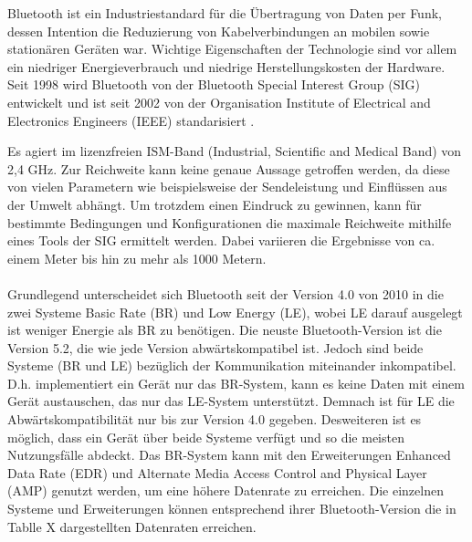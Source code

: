 Bluetooth ist ein Industriestandard für die Übertragung von Daten per Funk, dessen Intention die Reduzierung von Kabelverbindungen an mobilen sowie stationären Geräten war. Wichtige Eigenschaften der Technologie sind vor allem ein niedriger Energieverbrauch und niedrige Herstellungskosten der Hardware. Seit 1998 wird Bluetooth von der Bluetooth Special Interest Group (SIG) entwickelt und ist seit 2002 von der Organisation Institute of Electrical and Electronics Engineers (IEEE) standarisiert \cite{IEEE}.

Es agiert im lizenzfreien ISM-Band (Industrial, Scientific and Medical Band) von 2,4 GHz. 
Zur Reichweite kann keine genaue Aussage getroffen werden, da diese von vielen Parametern wie beispielsweise der Sendeleistung und Einflüssen aus der Umwelt abhängt. Um trotzdem einen Eindruck zu gewinnen, kann für bestimmte Bedingungen und Konfigurationen die maximale Reichweite mithilfe eines Tools \cite{BtRangeTool} der SIG ermittelt werden. Dabei variieren die Ergebnisse von ca. einem Meter bis hin zu mehr als 1000 Metern.
\\\\
Grundlegend unterscheidet sich Bluetooth seit der Version 4.0 von 2010 in die zwei Systeme Basic Rate (BR) und Low Energy (LE), wobei LE darauf ausgelegt ist weniger Energie als BR zu benötigen. Die neuste Bluetooth-Version ist die Version 5.2, die wie jede Version abwärtskompatibel ist. Jedoch sind beide Systeme (BR und LE) bezüglich der Kommunikation miteinander inkompatibel. D.h. implementiert ein Gerät nur das BR-System, kann es keine Daten mit einem Gerät austauschen, das nur das LE-System unterstützt. Demnach ist für LE die Abwärtskompatibilität nur bis zur Version 4.0 gegeben. Desweiteren ist es möglich, dass ein Gerät über beide Systeme verfügt und so die meisten Nutzungsfälle abdeckt. Das BR-System kann mit den Erweiterungen Enhanced Data Rate (EDR) und Alternate Media Access Control and Physical Layer (AMP) genutzt werden, um eine höhere Datenrate zu erreichen. Die einzelnen Systeme und Erweiterungen können entsprechend ihrer Bluetooth-Version die in Tablle X dargestellten Datenraten erreichen.\\

